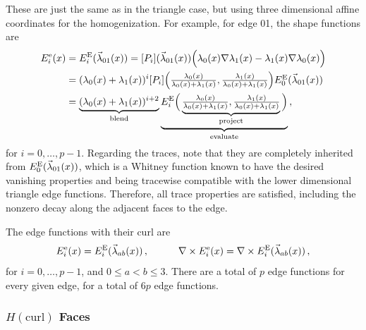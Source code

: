 These are just the same as in the triangle case, but using three dimensional affine coordinates for the homogenization.
For example, for edge 01, the shape functions are
\begin{equation*}
	\begin{aligned}
		E_i^\mathrm{e}(x)&=E_i^{\mathrm{E}}(\vec{\lambda}_{01}(x))=
			[P_i](\vec{\lambda}_{01}(x))\Big(\lambda_0(x)\nabla\lambda_1(x)-\lambda_1(x)\nabla\lambda_0(x)\Big)\\
    	&=(\lambda_0(x)+\lambda_1(x))^i
    [P_i]\Big(\textstyle{\frac{\lambda_0(x)}{\lambda_0(x)+\lambda_1(x)}},\textstyle{\frac{\lambda_1(x)}{\lambda_0(x)+\lambda_1(x)}}\Big)
    			E_0^{\mathrm{E}}(\vec{\lambda}_{01}(x))\\
    	&=\underbrace{(\lambda_0(x)+\lambda_1(x))^{i+2}}_{\text{blend}}
    		\underbrace{E_i^{\mathrm{E}}\Big(\underbrace{\textstyle{\frac{\lambda_0(x)}{\lambda_0(x)+\lambda_1(x)}},
    			\textstyle{\frac{\lambda_1(x)}{\lambda_0(x)+\lambda_1(x)}}}_{\text{project}}\Big)}_{\text{evaluate}}\,,
	\end{aligned}
\end{equation*}
for $i=0,\ldots,p-1$.
Regarding the traces, note that they are completely inherited from $E_0^{\mathrm{E}}(\vec{\lambda}_{01}(x))$, which is a Whitney function known to have the desired vanishing properties and being tracewise compatible with the lower dimensional triangle edge functions.
Therefore, all trace properties are satisfied, including the nonzero decay along the adjacent faces to the edge.

The edge functions with their curl are
\begin{equation}
	E_i^\mathrm{e}(x)=E_i^{\mathrm{E}}(\vec{\lambda}_{ab}(x))\,,\qquad\quad
		\nabla\times E_i^\mathrm{e}(x)=\nabla\times E_i^{\mathrm{E}}(\vec{\lambda}_{ab}(x))\,,
	\label{eq:TetEgeneral}
\end{equation}
for $i=0,\ldots,p-1$, and $0\leq a<b\leq3$. 
There are a total of $p$ edge functions for every given edge, for a total of $6p$ edge functions.

\subsubsection{\texorpdfstring{$H(\mathrm{curl})$}{Hcurl} Faces}


